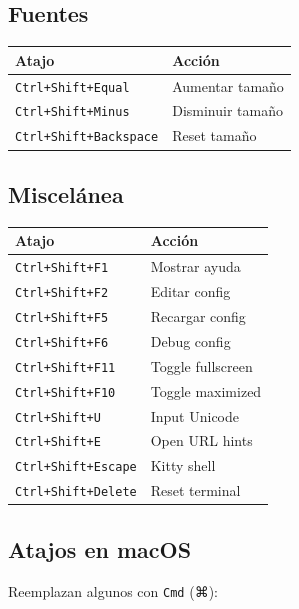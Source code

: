 \documentclass[
  doc,
  floatsintext,
  longtable,
  a4paper,
  nolmodern,
  notxfonts,
  notimes,
  12pt,
  colorlinks=true,linkcolor=blue,citecolor=blue,urlcolor=blue]{apa7}
\newcounter{none} %
\begin{document}
\subsection{Fuentes}\label{fuentes}

{\def\LTcaptype{none} %
\begin{longtable}[]{@{}ll@{}}
\toprule\noalign{}
Atajo & Acción \\
\midrule\noalign{}
\endhead
\bottomrule\noalign{}
\endlastfoot
\texttt{Ctrl+Shift+Equal} & Aumentar tamaño \\
\texttt{Ctrl+Shift+Minus} & Disminuir tamaño \\
\texttt{Ctrl+Shift+Backspace} & Reset tamaño \\
\end{longtable}
}

\subsection{Miscelánea}\label{misceluxe1nea}

{\def\LTcaptype{none} %
\begin{longtable}[]{@{}ll@{}}
\toprule\noalign{}
Atajo & Acción \\
\midrule\noalign{}
\endhead
\bottomrule\noalign{}
\endlastfoot
\texttt{Ctrl+Shift+F1} & Mostrar ayuda \\
\texttt{Ctrl+Shift+F2} & Editar config \\
\texttt{Ctrl+Shift+F5} & Recargar config \\
\texttt{Ctrl+Shift+F6} & Debug config \\
\texttt{Ctrl+Shift+F11} & Toggle fullscreen \\
\texttt{Ctrl+Shift+F10} & Toggle maximized \\
\texttt{Ctrl+Shift+U} & Input Unicode \\
\texttt{Ctrl+Shift+E} & Open URL hints \\
\texttt{Ctrl+Shift+Escape} & Kitty shell \\
\texttt{Ctrl+Shift+Delete} & Reset terminal \\
\end{longtable}
}

\subsection{Atajos en macOS}\label{atajos-en-macos}

Reemplazan algunos con \texttt{Cmd} (⌘):
\end{document}
